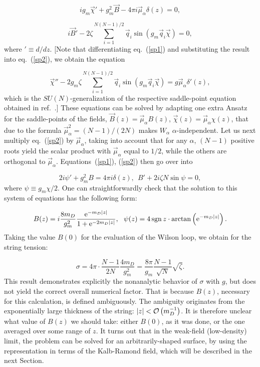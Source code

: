 \documentclass[a4paper,12pt]{article}
\begin{document}
\begin{equation}
\label{sp1}
ig_m\vec\chi'+g_m^2\vec B-4\pi i\vec\mu_\alpha\delta(z)=0,
\end{equation}

\begin{equation}
\label{sp2}
i\vec B'-2\zeta\sum\limits_{i=1}^{N(N-1)/2}\vec q_i\sin\left(g_m\vec q_i\vec\chi\right)=0,
\end{equation}
where $'\equiv d/dz$.
[Note that differentiating eq.~(\ref{sp1}) and substituting the result into eq.~(\ref{sp2}), we obtain the equation

$$\vec\chi''-2g_m\zeta\sum\limits_{i=1}^{N(N-1)/2}\vec q_i\sin\left(g_m\vec q_i\vec\chi\right)=g\vec\mu_\alpha
\delta'(z),$$
which is the $SU(N)$-generalization of the respective saddle-point equation obtained in ref.~\cite{polpl}.]
These equations can be solved by adapting one extra Ansatz for the saddle-points of the fields,
$\vec B(z)=\vec\mu_\alpha B(z)$, $\vec\chi(z)=\vec\mu_\alpha\chi(z)$, that due to the formula $\vec\mu_\alpha^2=(N-1)/(2N)$
makes $W_\alpha$ $\alpha$-independent. Let us next multiply eq.~(\ref{sp2}) by $\vec\mu_\alpha$, taking into account that
for any $\alpha$, $(N-1)$ positive roots yield the scalar product with $\vec\mu_\alpha$ equal to $1/2$, while the others are
orthogonal to $\vec\mu_\alpha$. Equations~(\ref{sp1}), (\ref{sp2}) then go over into

\begin{equation}
\label{SP}
2i\psi'+g_m^2B=4\pi i\delta(z),~~ B'+2i\zeta N\sin\psi=0,
\end{equation}
where $\psi\equiv g_m\chi/2$. One can straightforwardly check that the solution to this system of equations has the following form:

\begin{equation}
\label{solution}
B(z)=i\frac{8m_D}{g_m^2}\frac{{\rm e}^{-m_D|z|}}{1+{\rm e}^{-2m_D|z|}},~~
\psi(z)=4{\,}{\rm sgn}{\,}z\cdot\arctan\left({\rm e}^{-m_D|z|}\right).
\end{equation}
Taking the value $B(0)$ for the evaluation of the Wilson loop, we obtain for the string tension:

\begin{equation}
\label{Sig}
\sigma=4\pi\cdot\frac{N-1}{2N}\frac{4m_D}{g_m^2}=
\frac{8\pi}{g_m}\frac{N-1}{\sqrt{N}}\sqrt{\zeta}.
\end{equation}
This result demonstrates explicitly the nonanalytic behavior of $\sigma$ with $g$, but
does not yield the correct overall numerical factor. That is because $B(z)$, necessary for this calculation, is defined ambiguously.
The ambiguity originates from the exponentially
large thickness of the string: $|z|<{\cal O}\left(m_D^{-1}\right)$. It is therefore unclear what value of $B(z)$
we should take: either $B(0)$, as it was done, or the one averaged over some range of $z$. It turns out that in the weak-field (low-density) limit,
the problem can be solved for an arbitrarily-shaped surface, by using the representation in terms of the Kalb-Ramond field, which will
be described in the next Section.
\end{document}

